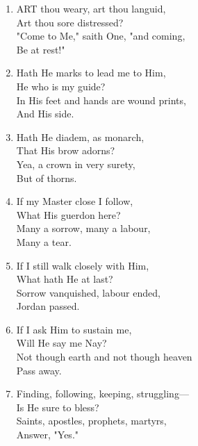 \begin{enumerate}
    \item ART thou weary, art thou languid, \\
            Art thou sore distressed? \\
        "Come to Me," saith One, "and coming, \\
            Be at rest!"

    \item Hath He marks to lead me to Him, \\
            He who is my guide? \\
        In His feet and hands are wound prints, \\
            And His side.

    \item Hath He diadem, as monarch, \\
            That His brow adorns? \\
        Yea, a crown in very surety, \\
            But of thorns.

    \item If my Master close I follow, \\
            What His guerdon here? \\
        Many a sorrow, many a labour, \\
            Many a tear.

    \item If I still walk closely with Him, \\
            What hath He at last? \\
        Sorrow vanquished, labour ended, \\
            Jordan passed.

    \item If I ask Him to sustain me, \\
            Will He say me Nay? \\
        Not though earth and not though heaven \\
            Pass away.

    \item Finding, following, keeping, struggling--- \\
            Is He sure to bless? \\
        Saints, apostles, prophets, martyrs, \\
            Answer, "Yes."

\end{enumerate}

